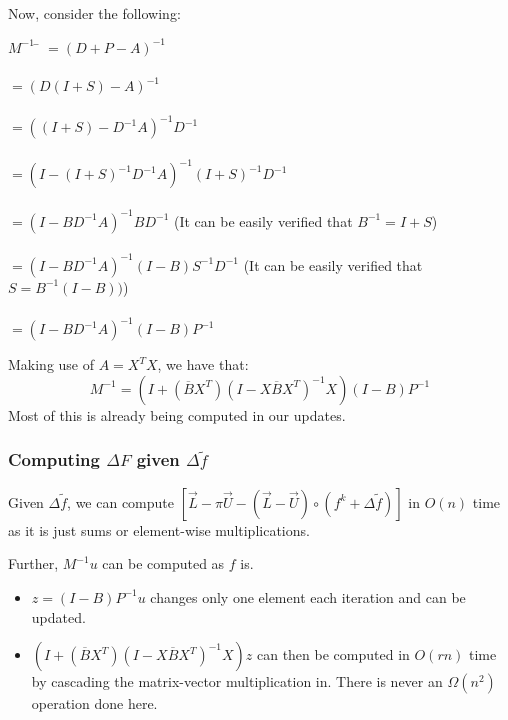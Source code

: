 \documentclass[12pt]{article}
\newcommand{\inv}[1]{#1^{-1}}
\begin{document}
			Now, consider the following:
			\begin{tabbing}
				$\inv{M}$ \= $= \inv{(D + P - A)}$\\\\
				\>$=\inv{(D(I+S)-A)}$\\\\
				\>$=\inv{((I+S)-\inv{D}A)}\inv{D}$\\\\
				\>$=\inv{(I-\inv{(I+S)}\inv{D}A)}\inv{(I+S)}\inv{D}$\\\\
				\>$=\inv{(I-B\inv{D}A)}B\inv{D}$ \hspace{5mm}(It can be easily verified that $\inv{B} = I+S$)\\\\
				\>$=\inv{(I-B\inv{D}A)}(I-B)\inv{S}\inv{D}$ \hspace{5mm} (It can be easily verified that $S = \inv{B}(I-B))$)\\\\
				\>$=\inv{(I-B\inv{D}A)}(I-B)\inv{P}$
			\end{tabbing}

			Making use of $A = X^TX$, we have that:
			\begin{equation}
				\inv{M}=(I+(\overline{B}X^T)\inv{(I-X\overline{B}X^T)}X)(I-B)\inv{P}
			\end{equation}
			Most of this is already being computed in our updates.

		\subsubsection{Computing $\Delta F$ given $\Delta \widetilde{f}$}
			Given $\Delta \widetilde{f}$, we can compute $\left[\overrightarrow{L} - \pi\overrightarrow{U} - (\overrightarrow{L}-\overrightarrow{U})\circ(f^k + \Delta \widetilde{f})\right]$ in $O(n)$ time as it is just sums or element-wise multiplications.

			Further, $\inv{M}u$ can be computed as $f$ is.
			\begin{itemize}
				\item $z = (I-B)\inv{P}u$ changes only one element each iteration and can be updated.
				\item $(I+(\overline{B}X^T)\inv{(I-X\overline{B}X^T)}X)z$ can then be computed in $O(rn)$ time by cascading the matrix-vector multiplication in. There is never an $\Omega(n^2)$ operation done here.
			\end{itemize}
\end{document}
